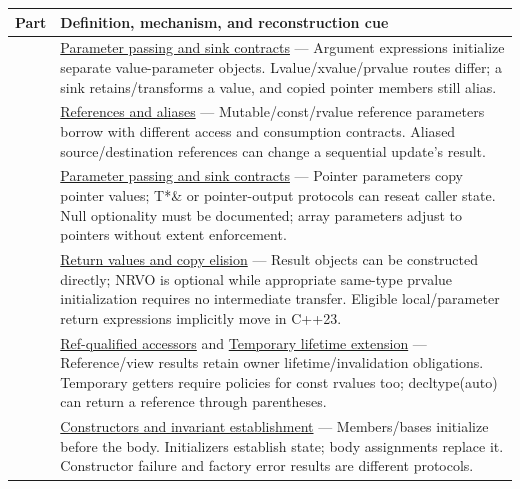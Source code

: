 {\def\LTcaptype{none} %
\begin{longtable}[]{@{}
  >{\raggedright\arraybackslash}p{}
  >{\raggedright\arraybackslash}p{}@{}}
\toprule\noalign{}
\begin{minipage}[b]{\linewidth}\raggedright
Part
\end{minipage} & \begin{minipage}[b]{\linewidth}\raggedright
Definition, mechanism, and reconstruction cue
\end{minipage} \\
\midrule\noalign{}
\endhead
\bottomrule\noalign{}
\endlastfoot
127 & \hyperref[appendix-d5908f75721f]{Parameter passing and sink contracts} --- Argument expressions initialize separate value-parameter objects. Lvalue/xvalue/prvalue routes differ; a sink retains/transforms a value, and copied pointer members still alias. \\
128 & \hyperref[appendix-d6d562ca9fbb]{References and aliases} --- Mutable/const/rvalue reference parameters borrow with different access and consumption contracts. Aliased source/destination references can change a sequential update's result. \\
129 & \hyperref[appendix-d5908f75721f]{Parameter passing and sink contracts} --- Pointer parameters copy pointer values; T*\& or pointer-output protocols can reseat caller state. Null optionality must be documented; array parameters adjust to pointers without extent enforcement. \\
130 & \hyperref[appendix-b08d3788c5c6]{Return values and copy elision} --- Result objects can be constructed directly; NRVO is optional while appropriate same-type prvalue initialization requires no intermediate transfer. Eligible local/parameter return expressions implicitly move in C++23. \\
131 & \hyperref[appendix-d42039b1d6f7]{Ref-qualified accessors} and \hyperref[appendix-a978b29bbbb0]{Temporary lifetime extension} --- Reference/view results retain owner lifetime/invalidation obligations. Temporary getters require policies for const rvalues too; decltype(auto) can return a reference through parentheses. \\
132 & \hyperref[appendix-7f8ec83d0886]{Constructors and invariant establishment} --- Members/bases initialize before the body. Initializers establish state; body assignments replace it. Constructor failure and factory error results are different protocols. \\

\end{longtable}}
